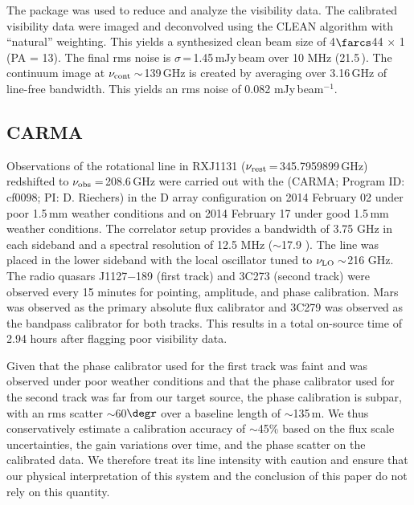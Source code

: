 \documentclass[]{emulateapj}
\begin{document}
The  package was used to reduce and analyze the visibility data.
The calibrated visibility data were imaged and deconvolved using the CLEAN algorithm with ``natural''
weighting. This yields a synthesized clean beam size of 4$\farcs$44 $\times$ 1 (PA = 13\degr).
The final rms noise is $\sigma$\,=\,1.45\,mJy\,beam\pmOne
over 10 MHz (21.5\,\kms). The continuum image at $\nu_{\rm cont}\sim$139\,GHz
is created by averaging over 3.16\,GHz of line-free bandwidth. This
yields an rms noise of 0.082 mJy\,beam$^{-1}$. %

\subsection{CARMA \cco}
Observations of the \cco rotational line in RXJ1131
($\nu_{\rm rest}$\,=\,345.7959899\,GHz) redshifted to $\nu_{\rm obs}$\,=\,208.6\,GHz
were carried out with the \carma (CARMA;
Program ID: cf0098; PI: D. Riechers)
in the D array configuration on 2014 February 02 under poor 1.5\,mm
weather conditions and on 2014 February 17 under good 1.5\,mm
weather conditions. The correlator setup provides a bandwidth of 3.75 GHz in
each sideband and a spectral resolution of 12.5 MHz ($\sim$17.9 \kms). The
line was placed in the lower sideband with the local oscillator tuned to $\nu_{\rm LO}\sim$216 GHz. The radio quasars J1127$-$189 (first track) and 3C273
(second track) were observed
every 15 minutes for pointing, amplitude, and phase calibration. Mars was
observed as the primary absolute flux calibrator and 3C279 was observed as
the bandpass calibrator for both tracks. This results in a total on-source time of 2.94 hours after flagging poor
visibility data.

%
%
Given that the phase calibrator used for the first track was faint and was
observed under poor weather conditions and that the phase calibrator used for
the second track was far from our target source, the phase calibration is
subpar, with an rms scatter $\sim$60$\degr$ over a baseline length of $\sim$135\,m.
We thus conservatively estimate
a calibration accuracy of $\sim$45\% based on the flux scale uncertainties,
the gain variations over time, and the phase scatter on the calibrated data. We
therefore treat its line intensity with caution and ensure that our physical interpretation
of this system and the conclusion of this paper do not rely on this quantity.
\end{document}
